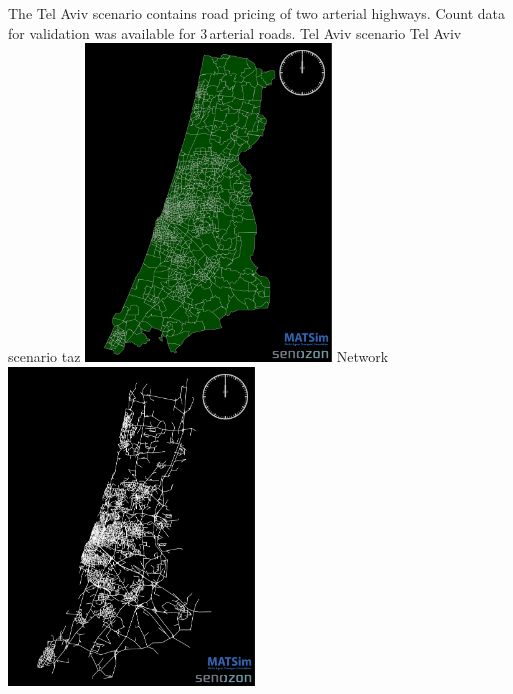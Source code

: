 The Tel Aviv scenario contains road pricing of two arterial highways. Count data for validation was available for 3\,arterial roads.
%
\createfigure%
{Tel Aviv scenario}%
{Tel Aviv scenario}%
{\label{fig:telavivscenario}}%
{%
  \createsubfigure%
  {\protect\gls{taz}}%
  {\includegraphics[width=0.49\textwidth,angle=0]{using/figures/TelAviv_TAZ}}%
  {\label{fig:TAZ}}%
  {}%
  \createsubfigure%
  {Network}%
	{\includegraphics[width=0.49\textwidth,angle=0]{using/figures/TelAviv_RoadNetwork}}%
  {\label{fig:network}}%
  {}%
}%
{}


